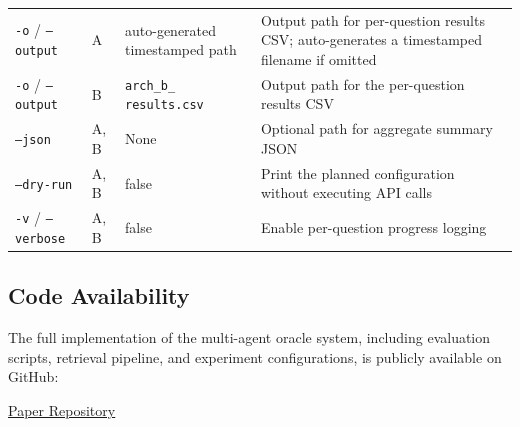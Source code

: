\begin{table}[ht]
\begin{tabular}{p{4cm} p{1.5cm} p{3.5cm} p{5.5cm}}
\texttt{-o} / \texttt{--output} & A & auto-generated timestamped path & Output path for per-question results CSV; auto-generates a timestamped filename if omitted \\
\texttt{-o} / \texttt{--output} & B & \texttt{arch\_b\_} \newline \texttt{results.csv} & Output path for the per-question results CSV \\
\texttt{--json} & A, B & None & Optional path for aggregate summary JSON \\
\texttt{--dry-run} & A, B & false & Print the planned configuration without executing API calls \\
\texttt{-v} / \texttt{--verbose} & A, B & false & Enable per-question progress logging \\
\bottomrule
\end{tabular}
\end{table}

\subsection{Code Availability}
\label{sec:code-availability}

The full implementation of the multi-agent oracle system, including evaluation scripts, retrieval pipeline, and experiment configurations, is publicly available on GitHub:

\begin{center}
\href{https://github.com/Tkota10/Senior-Thesis-Multi-LLM-Resolution}{\underline{\textcolor{blue!70!black}{Paper Repository}}}
\end{center}
